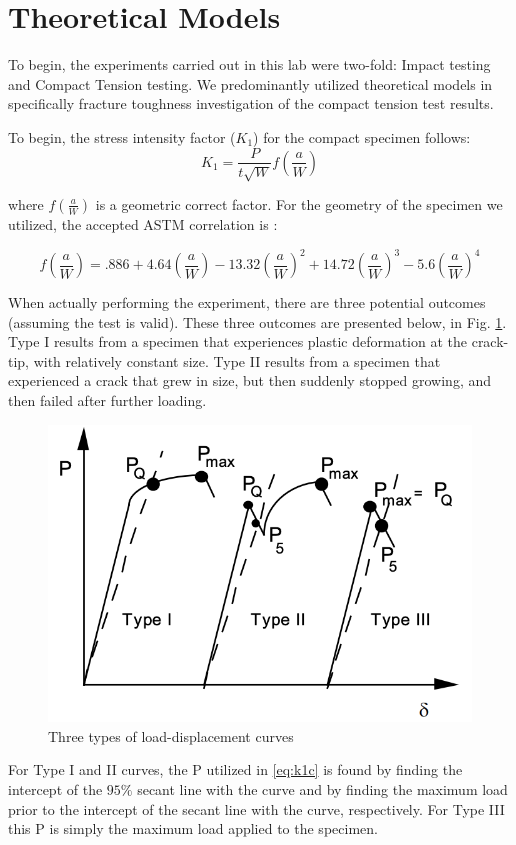 \documentclass{article}
\begin{document}
\section{Theoretical Models}
To begin, the experiments carried out in this lab were two-fold: Impact testing and Compact Tension testing. We predominantly utilized theoretical models in specifically fracture toughness investigation of the compact tension test results. 

To begin, the stress intensity factor ($K_1$) for the compact specimen follows:
\begin{equation}
    K_{1} =  \frac{P}{t\sqrt{W}}f\left( \frac{a}{W}\right)
    \label{eq:k1c}
\end{equation}

where $f\left( \frac{a}{W}\right)$ is a geometric correct factor. For the geometry of the specimen we utilized, the accepted ASTM correlation is \cite{manual}:

\begin{equation}
    f\left(\frac{a}{W}\right) = .886+4.64\left(\frac{a}{W}\right) −13.32\left(\frac{a}{W}\right)^2+14.72\left(\frac{a}{W}\right)^3−5.6\left(\frac{a}{W}\right)^4
\end{equation}

When actually performing the experiment, there are three potential outcomes (assuming the test is valid). These three outcomes are presented below, in Fig. \ref{fig:3types}. Type I results from a specimen that experiences  plastic deformation at the crack-tip, with relatively constant size. Type II results from a specimen that experienced a crack that grew in size, but then suddenly stopped growing, and then failed after further loading. 

\begin{figure}[!h]
    \centering
    \includegraphics[width=0.5\linewidth]{plots/3types.png}
    \caption{Three types of load-displacement curves}
    \label{fig:3types}
\end{figure}

For Type I and II curves, the P utilized in \eqref{eq:k1c} is found by finding the intercept of the $95\%$ secant line with the curve and by finding the maximum load prior to the intercept of the secant line with the curve, respectively. For Type III this P is simply the maximum load applied to the specimen. 
\end{document}
